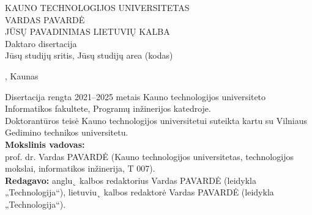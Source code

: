 \begin{titlepage}
   \begin{center}
   	 


       \MakeUppercase{\Large {Kauno Technologijos Universitetas}}\\
       \vspace{5cm}
       \MakeUppercase{\Large Vardas Pavardė}\\
       \vspace{2cm}
       \huge
        \expandafter\expandafter\MakeUppercase{Jūsų pavadinimas lietuvių kalba} \\
        \large
        \vspace{3cm}
        	{\large Daktaro disertacija} \\
            {\large Jūsų studijų sritis, Jūsų studijų area (kodas)}

       \vfill
       
       
      \large{{\the\year, Kaunas}}
   \end{center}
   \pagebreak
   \thispagestyle{empty}
   \noindent Disertacija rengta 2021–2025 metais Kauno technologijos universiteto Informatikos fakultete, Programų inžinerijos katedroje.\\
   
   \noindent Doktorantūros teisė Kauno technologijos universitetui suteikta kartu su Vilniaus Gedimino technikos universitetu.\\
   
   \noindent \textbf{Mokslinis vadovas:}\\
   prof. dr. Vardas PAVARDĖ (Kauno technologijos universitetas, technologijos mokslai, informatikos inžinerija, T 007).\\
   
   \noindent \textbf{Redagavo:} anglu˛ kalbos redaktorius Vardas PAVARDĖ (leidykla „Technologija“), lietuviu˛ kalbos redaktorė Vardas PAVARDĖ (leidykla „Technologija“).\\
   

\end{titlepage}
